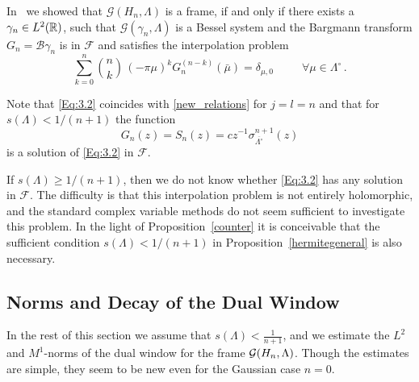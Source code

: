 \documentclass[12pt]{amsart}
\begin{document}
In~\cite[Prop.~3.3]{glyu} we showed that $\mathcal{G}(H_n, \Lambda )$ is a
frame, if and only if there exists a $\gamma_n \in L^2(\mathbb{R} )$, such
that $\mathcal{G}(\gamma _n, \Lambda )$ is a Bessel system and the
Bargmann transform $G_n = \mathcal{B}\gamma _n$ is in $\mathcal{F}$ and  satisfies the interpolation
problem
\begin{equation}
  \label{Eq:3.2}
  \sum _{k=0}^n   \binom{n}{k} \,
         (-\pi \mu )^k G_n^{(n-k)} (\bar{\mu })   = \delta _{\mu , 0} \, \qquad
         \,\, \forall \mu \in \Lambda ^\circ \, .
\end{equation}
 
Note that \eqref{Eq:3.2} coincides with   \eqref{new_relations} for $j=l=n$
and that for $s(\Lambda ) < 1/(n+1)$ the function
\begin{equation}
  \label{eq:dualcc}
  G_n(z) = S_n(z) = c z^{-1}\sigma_{\overline{\Lambda^\circ}}^{n+1}(z)
\end{equation}
is a solution of \eqref{Eq:3.2} in $\mathcal{F}$. 

If $s(\Lambda ) \geq 1/(n+1)$, then we do not know whether
\eqref{Eq:3.2} has any solution in $\mathcal{F}$. The difficulty is
that this interpolation problem is not entirely holomorphic, and
the standard complex variable methods do not seem sufficient to investigate this
problem. In the light of Proposition~\ref{counter} it is conceivable
that the sufficient condition  $s(\Lambda) < 1/(n+1) $ in
Proposition~\ref{hermitegeneral} is also necessary. 


\subsection{Norms and Decay of the Dual Window}


In the rest of this section we assume that $ s(\Lambda)<\frac 1 {n+1}$,
and  we estimate  the $L^2$ and $M^1$-norms of the
dual window for the frame  
$\mathcal{G} (H_n , \Lambda )$.  Though the estimates are  simple, they  seem
to be new even for the Gaussian case  $n=0$.  
\end{document}

